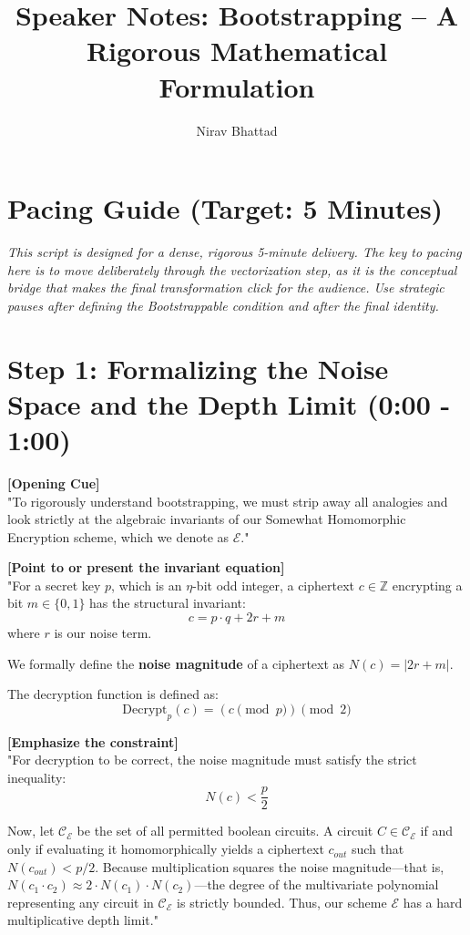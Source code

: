 \documentclass[11pt]{article}
\title{Speaker Notes: Bootstrapping -- A Rigorous Mathematical Formulation}
\author{Nirav Bhattad}
\date{}
\begin{document}
\maketitle

\section*{Pacing Guide (Target: 5 Minutes)}
\textit{This script is designed for a dense, rigorous 5-minute delivery. The key to pacing here is to move deliberately through the vectorization step, as it is the conceptual bridge that makes the final transformation click for the audience. Use strategic pauses after defining the Bootstrappable condition and after the final identity.}

\hrulefill

\section*{Step 1: Formalizing the Noise Space and the Depth Limit (0:00 - 1:00)}

\textbf{[Opening Cue]} \\
"To rigorously understand bootstrapping, we must strip away all analogies and look strictly at the algebraic invariants of our Somewhat Homomorphic Encryption scheme, which we denote as $\mathcal{E}$."

\textbf{[Point to or present the invariant equation]} \\
"For a secret key $p$, which is an $\eta$-bit odd integer, a ciphertext $c \in \mathbb{Z}$ encrypting a bit $m \in \{0, 1\}$ has the structural invariant:
$$c = p \cdot q + 2r + m$$
where $r$ is our noise term. 

We formally define the \textbf{noise magnitude} of a ciphertext as $N(c) = |2r + m|$. 

The decryption function is defined as:
$$\text{Decrypt}_{p}(c) = (c \pmod p) \pmod 2$$

\textbf{[Emphasize the constraint]} \\
"For decryption to be correct, the noise magnitude must satisfy the strict inequality:
$$N(c) < \frac{p}{2}$$

Now, let $\mathcal{C}_{\mathcal{E}}$ be the set of all permitted boolean circuits. A circuit $C \in \mathcal{C}_{\mathcal{E}}$ if and only if evaluating it homomorphically yields a ciphertext $c_{out}$ such that $N(c_{out}) < p/2$. Because multiplication squares the noise magnitude---that is, $N(c_1 \cdot c_2) \approx 2 \cdot N(c_1) \cdot N(c_2)$---the degree of the multivariate polynomial representing any circuit in $\mathcal{C}_{\mathcal{E}}$ is strictly bounded. Thus, our scheme $\mathcal{E}$ has a hard multiplicative depth limit."
\end{document}
